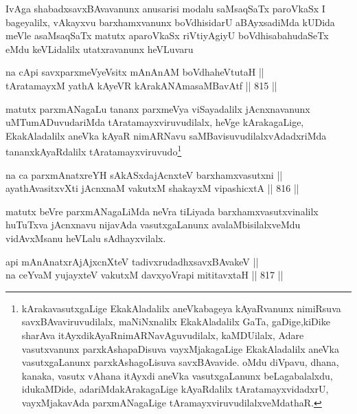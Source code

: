 \begin{artha}
IvAga shabadxsavxBAvavanunx anusarisi modalu saMsaqSaTx paroVkaSx I bageyalilx, vAkayxvu barxhamxvanunx boVdhisidarU aBAyxsadiMda kUDida meVle asaMsaqSaTx matutx aparoVkaSx riVtiyAgiyU boVdhisabahudaSeTx eMdu keVLidalilx utatxravanunx heVLuvaru\ndash 
\end{artha}

\begin{shl}
na cApi savxparxmeVyeV\s sitx mAnAnAM boVdhaheVtutaH || \\
tAratamayxM yathA kAyeVR kArakANAmasaMBavAtf \hfill || 815 ||  
\end{shl}

\begin{artha}
matutx parxmANagaLu tananx parxmeVya viSayadalilx jAcnxnavanunx uMTumADuvudariMda tAratamayxviruvudilalx, heVge kArakagaLige, EkakAladalilx aneVka kAyaR nimARNavu saMBavisuvudilalxvAdadxriMda tananxkAyaRdalilx tAratamayxviruvudo\footnote{kArakavasutxgaLige EkakAladalilx aneVkabageya kAyaRvanunx nimiRsuva savxBAvaviruvudilalx, maNiNxnalilx EkakAladalilx GaTa, gaDige,kiDike sharAva itAyxdikAyaRnimARNavAguvudilalx, kaMDUilalx, Adare vasutxvanunx parxkAshapaDisuva vayxMjakagaLige EkakAladalilx aneVka vasutxgaLanunx parxkAshagoLisuva savxBAvavide. oMdu diVpavu, dhana, kanaka, vasutx vAhana itAyxdi aneVka vasutxgaLanunx beLagabalalxdu, idukaMDide, adariMdakArakagaLige kAyaRdalilx tAratamayxvidadxrU, vayxMjakavAda parxmANagaLige tAramayxviruvudilalxveMdathaR.}
\end{artha}

\begin{shl}
na ca parxmAnatxreYH sAkASxdajAcnxteV barxhamxvasutxni || \\
ayathAvasitxvXti jAcnxnaM vakutxM shakayxM vipashicxtA \hfill || 816 ||  
\end{shl}

\begin{artha}
matutx beVre parxmANagaLiMda neVra tiLiyada barxhamxvasutxvinalilx huTuTxva jAcnxnavu nijavAda vasutxgaLanunx avalaMbisilalxveMdu vidAvxMsanu heVLalu sAdhayxvilalx.
\end{artha}


\begin{shl}
api mAnAnatxrAjAjxcnXteV tadivxrudadhxsavxBAvakeV || \\
na ceYvaM yujayxteV vakutxM davxyoVrapi mititavxtaH \hfill || 817 ||  
\end{shl}

